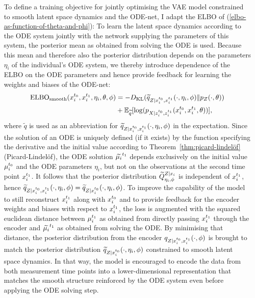 To define a training objective for jointly optimising the VAE model constrained to smooth latent space dynamics and the ODE-net, I adapt the ELBO of (\ref{elbo-as-function-of-theta-and-phi}): To learn the latent space dynamics according to the ODE system jointly with the network supplying the parameters of this system, the posterior mean as obtained from solving the ODE is used. Because this mean and therefore also the posterior distribution depends on the parameters $\eta_i$ of the individual's ODE system, we thereby introduce dependence of the ELBO on the ODE parameters and hence provide feedback for learning the weights and biases of the ODE-net:
\begin{equation}
\begin{split}
\mathrm{ELBO}_{\mathrm{smooth}}(x_i^{t_0}, x_i^{t_1}, \eta_i, \theta, \phi) &= -D_{\mathrm{KL}}(\widetilde{q}_{Z\mid x_i^{t_0}, x_i^{t_1}}(\cdot, \eta_i, \phi) \Vert p_Z(\cdot,\theta)) \\ 
&+ \mathbb{E}_{\widetilde{q}}[\log(p_{X\mid z_i^{t_0}, z_i^{t_1}}(x_i^{t_0}, x_i^{t_1},\theta))],
\end{split}
\end{equation}
where $\widetilde{q}$ is used as an abbreviation for $\widetilde{q}_{Z\mid x_i^{t_0}, x_i^{t_1}}(\cdot, \eta_i, \phi)$ in the expectation.
Since the solution of an ODE is uniquely defined (if it exists) by the function specifying the derivative and the initial value according to Theorem~\ref{thm:picard-lindelöf} (Picard-Lindelöf), the ODE solution $\widetilde{\mu_i}^{t_1}$ depends exclusively on the initial value $\mu_i^{t_0}$ and the ODE parameters $\eta_i$, but not on the observations at the second time point $x_i^{t_1}$. 
It follows that the posterior distribution $\widetilde{Q}^{Z\mid x_i}_{\eta_i, \phi}$ is independent of $x_i^{t_1}$, hence $\widetilde{q}_{Z\mid x_i^{t_0}, x_i^{t_1}}(\cdot, \eta_i, \phi) = \widetilde{q}_{Z\mid x_i^{t_0}}(\cdot, \eta_i, \phi)$. To improve the capability of the model to still reconstruct $x_i^{t_1}$ along with $x_i^{t_0}$ and to provide feedback for the encoder weights and biases with respect to $x_i^{t_1}$, the loss is augmented with the squared euclidean distance between $\mu_i^{t_1}$ as obtained from directly passing $x_i^{t_1}$ through the encoder and $\widetilde{\mu_i}^{t_1}$ as obtained from solving the ODE.
By minimising that distance, the posterior distribution from the encoder $q_{Z\mid x_i^{t_0}, x_i^{t_1}}(\cdot,\phi)$ is brought to match the posterior distribution $\widetilde{q}_{Z\mid x_i^{t_0}}(\cdot, \eta_i, \phi)$ constrained to smooth latent space dynamics. In that way, the model is encouraged to encode the data from both measurement time points into a lower-dimensional representation that matches the smooth structure reinforced by the ODE system even before applying the ODE solving step.
